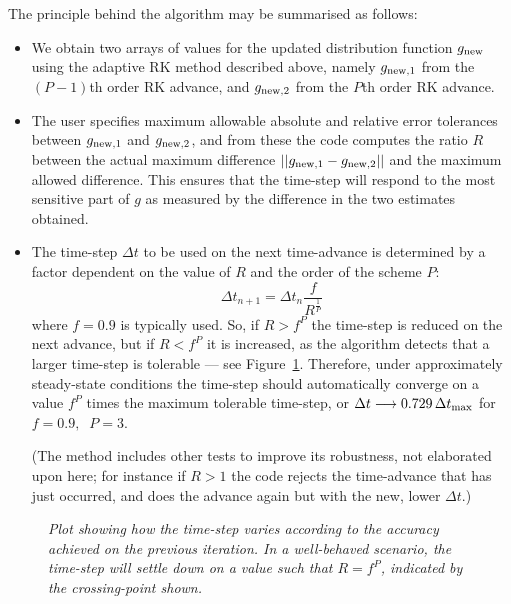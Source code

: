 \documentclass[10pt,a4paper]{article}
\begin{document}
The principle behind the algorithm may be summarised as follows:
\begin{itemize}

\item We obtain two arrays of values for the updated distribution function
  $g_{\mbox{\scriptsize new}}$ using the adaptive RK method described above,
  namely $g_{\mbox{\scriptsize new},1}$ from the $(P-1)$th order RK advance,
  and $g_{\mbox{\scriptsize new},2}$ from the $P$th order RK advance.

\item The user specifies maximum allowable absolute and relative error
  tolerances between $g_{\mbox{\scriptsize new},1}$ and $g_{\mbox{\scriptsize
      new},2}$, and from these the code computes the ratio $R$ between the
  actual maximum difference $|| g_{\mbox{\scriptsize new},1} -
  g_{\mbox{\scriptsize new},2}||$ and the maximum allowed difference. This
  ensures that the time-step will respond to the most sensitive part of $g$ as
  measured by the difference in the two estimates obtained.

\item The time-step $\Delta t$ to be used on the next time-advance is
  determined by a factor dependent on the value of $R$ and the order of the
  scheme $P$:
\[
\Delta t_{n+1} = \Delta t_n \frac{f}{R^{\frac{1}{P}}}
\]
where $f = 0.9$ is typically used. So, if $R > f^P$ the time-step is reduced
on the next advance, but if $R < f^P$ it is increased, as the algorithm
detects that a larger time-step is tolerable --- see
Figure~\ref{fig:adaptivedt1}. Therefore, under approximately steady-state
conditions the time-step should automatically converge on a value $f^P$ times
the maximum tolerable time-step, or $\Delta t \longrightarrow 0.729\,\Delta
t_{\mbox{\scriptsize max}}$ for $f=0.9, \;\; P=3$.

(The method includes other tests to improve its robustness, not elaborated
upon here; for instance if $R > 1$ the code rejects the time-advance that has
just occurred, and does the advance again but with the new, lower $\Delta t$.)

\end{itemize}

\begin{figure}[!p]
  \begin{center}
  \end{center}
  \caption{\textit{Plot showing how the time-step varies according to the
      accuracy achieved on the previous iteration. In a well-behaved scenario,
      the time-step will settle down on a value such that $R=f^P$, indicated
      by the crossing-point shown.}
    \label{fig:adaptivedt1} }
\end{figure}
\end{document}
